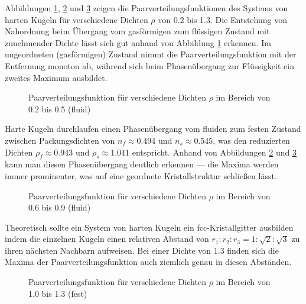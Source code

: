 Abbildungen \ref{fig:paarverteilung1}, \ref{fig:paarverteilung2} und \ref{fig:paarverteilung3} zeigen die Paarverteilungsfunktionen des Systems von harten Kugeln für verschiedene Dichten $\rho$ von 0.2 bis 1.3. Die Entstehung von Nahordnung beim Übergang vom gasförmigen zum flüssigen Zustand mit zunehmender Dichte lässt sich gut anhand von Abbildung \ref{fig:paarverteilung1} erkennen. Im ungeordneten (gasförmigen) Zustand nimmt die Paarverteilungsfunktion mit der Entfernung monoton ab, während sich beim Phasenübergang zur Flüssigkeit ein zweites Maximum ausbildet. 

\begin{figure}[H]
 \centering
 \resizebox{0.9\textwidth}{!}{}
 \caption{Paarverteilungsfunktion für verschiedene Dichten $\rho$ im Bereich von 0.2 bis 0.5 (fluid)}
 \label{fig:paarverteilung1}
\end{figure} 

Harte Kugeln durchlaufen einen Phasenübergang vom fluiden zum festen Zustand zwischen Packungsdichten von $n_f \approx 0.494$ und $n_s \approx 0.545$, was den reduzierten Dichten $\rho_f \approx 0.943$ und $\rho_s \approx 1.041$ entspricht. Anhand von Abbildungen \ref{fig:paarverteilung2} und \ref{fig:paarverteilung3} kann man diesen Phasenübergang deutlich erkennen --- die Maxima werden immer prominenter, was auf eine geordnete Kristallstruktur schließen lässt. 
 
\begin{figure}[H]
 \centering
 \resizebox{0.9\textwidth}{!}{}
  \caption{Paarverteilungsfunktion für verschiedene Dichten $\rho$ im Bereich von 0.6 bis 0.9 (fluid) }
 \label{fig:paarverteilung2}
\end{figure} 
 
Theoretisch sollte ein System von harten Kugeln ein fcc-Kristallgitter ausbilden indem die einzelnen Kugeln einen relativen Abstand von $r_1 : r_2 : r_3 = 1 : \sqrt{2} : \sqrt{3}$ zu ihren nächsten Nachbarn aufweisen. Bei einer Dichte von 1.3 finden sich die Maxima der Paarverteilungsfunktion auch ziemlich genau in diesen Abständen. 
 

\begin{figure}[H]
 \centering
  \resizebox{0.9\textwidth}{!}{}
 \caption{Paarverteilungsfunktion für verschiedene Dichten $\rho$ im Bereich von 1.0 bis 1.3 (fest) }
 \label{fig:paarverteilung3}
\end{figure} 

